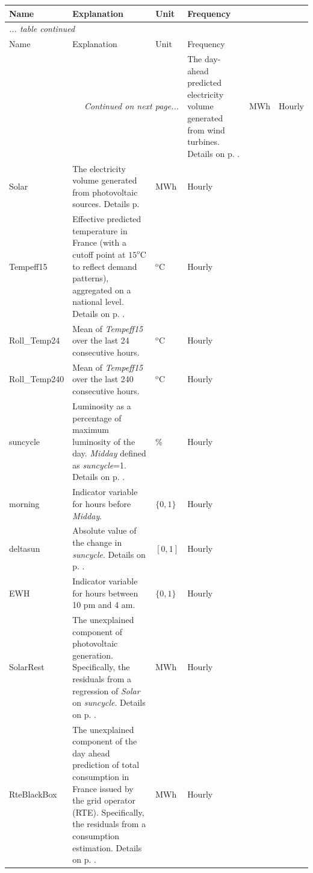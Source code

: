 \begin{center}
\begin{longtable}{p{2cm} p{8.5cm} p{1.3cm}  p{1.5cm}}
 \multicolumn{1}{l}{Name}   & Explanation & Unit  & Frequency \\
\midrule
 \endfirsthead
\multicolumn{3}{l}{\emph{... table \thetable{} continued}} \\
 \multicolumn{1}{l}{Name}   & Explanation  & Unit  & Frequency \\
\midrule
\endhead
\midrule
\multicolumn{3}{r}{\emph{Continued on next page...}}
\endfoot
\endlastfoot
Wind1DA & The day-ahead predicted electricity volume generated from wind turbines. 
Details on p. \pageref{Wind1DA}. & MWh  & Hourly   \\
\midrule 
Solar & The electricity volume generated from photovoltaic sources. 
Details p. \pageref{Solar} & MWh &  Hourly \\  
\midrule
Tempeff15 & 
Effective predicted temperature in France (with a cutoff point at $15^o$C to reflect demand patterns), aggregated on a national level.
Details on p. \pageref{Tempeff15}. & $^\text{o}$C & Hourly\\
\midrule
 Roll\_Temp24 &  Mean of \emph{Tempeff15} over the last 24 consecutive hours. 
  &  $^\text{o}$C   & Hourly \\
\midrule
 Roll\_Temp240 & Mean of \emph{Tempeff15} over the last 240 consecutive hours. 
 &  $^\text{o}$C   & Hourly\\
\midrule
suncycle & Luminosity as a percentage of maximum luminosity of the day. 
\emph{Midday} defined as \emph{suncycle}=1. Details on p. \pageref{suncycle}.  & $\%$ & Hourly\\
\midrule
 morning & Indicator variable for hours before \emph{Midday}. 
 &$ \{0,1\}$ & Hourly\\
\midrule
 deltasun & Absolute value of the change in \emph{suncycle}. Details on p. \pageref{deltasun}. & $ [0,1]$ & Hourly\\
 \midrule 
 EWH & Indicator variable for hours between 10 pm and 4 am.
 & $ \{0,1\}$ & Hourly\\
 \midrule
SolarRest & The unexplained component of photovoltaic generation. Specifically, the residuals from a regression of \emph{Solar} on \emph{suncycle}. Details on p. \pageref{SolarRest}. & MWh &  Hourly \\  
\midrule
RteBlackBox & The unexplained component of the day ahead prediction of total consumption in France issued by the grid operator (RTE). Specifically, the residuals from a consumption estimation. Details on p. \pageref{RteBlackBox}. & MWh &  Hourly \\  

\end{longtable}
\end{center}
